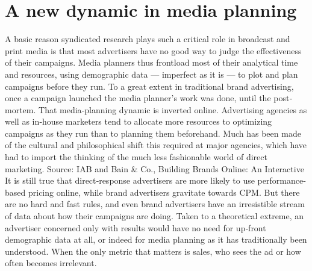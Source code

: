 \section{A new dynamic in media planning}
A basic reason syndicated research plays such a critical role in broadcast
and print media is that most advertisers have no good way to judge the
effectiveness of their campaigns. Media planners thus frontload most of
their analytical time and resources, using demographic data — imperfect
as it is — to plot and plan campaigns before they run. To a great extent in
traditional brand advertising, once a campaign launched the media
planner’s work was done, until the post‐mortem.
That media‐planning dynamic is inverted online. Advertising agencies as
well as in‐house marketers tend to allocate more resources to optimizing
campaigns as they run than to planning them beforehand. Much has been
made of the cultural and philosophical shift this required at major
agencies, which have had to import the thinking of the much less
fashionable world of direct marketing.
Source: IAB and Bain & Co., Building Brands Online: An Interactive
It is still true that direct‐response advertisers are more likely to use
performance‐based pricing online, while brand advertisers gravitate
towards CPM. But there are no hard and fast rules, and even brand
advertisers have an irresistible stream of data about how their campaigns
are doing. Taken to a theoretical extreme, an advertiser concerned only
with results would have no need for up‐front demographic data at all, or
indeed for media planning as it has traditionally been understood. When
the only metric that matters is sales, who sees the ad or how often
becomes irrelevant.
